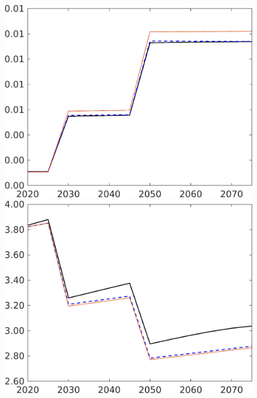 \begin{figure}[h!!]
\begin{minipage}[]{0.32\textwidth}
\end{minipage}
\begin{minipage}[]{0.32\textwidth}
	\includegraphics[width=1\textwidth]{../../codding_model/own_basedOnFried/optimalPol_elastS_DisuSci/figures/all_1705/Lg_CompEffOPT_T_NoTaus_spillover0_noskill1_sep1_BN0_ineq0_red0_etaa0.79_lgd0.png}
\end{minipage}
\begin{minipage}[]{0.32\textwidth}
	\includegraphics[width=1\textwidth]{../../codding_model/own_basedOnFried/optimalPol_elastS_DisuSci/figures/all_1705/wh_CompEffOPT_T_NoTaus_spillover0_noskill1_sep1_BN0_ineq0_red0_etaa0.79_lgd0.png}

\end{minipage}
\end{figure}
